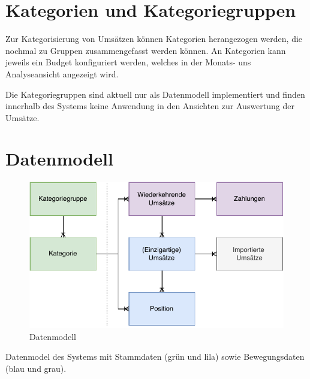 \section{Kategorien und Kategoriegruppen}

Zur Kategorisierung von Umsätzen können Kategorien herangezogen werden, die nochmal zu Gruppen zusammengefasst werden können. An Kategorien kann jeweils ein Budget konfiguriert werden, welches in der Monats- uns Analyseansicht angezeigt wird. 

Die Kategoriegruppen sind aktuell nur als Datenmodell implementiert und finden innerhalb des Systems keine Anwendung in den Ansichten zur Auswertung der Umsätze. 

\section{Datenmodell} 

\begin{figure}[ht!]
	\centering
	\includegraphics[width=.8\textwidth]{img/DataModel}
	\vspace{0em}
	\caption{Datenmodell}
	\label{fig:datamodel}
\end{figure}

Datenmodel des Systems mit Stammdaten (grün und lila) sowie Bewegungsdaten (blau und grau).